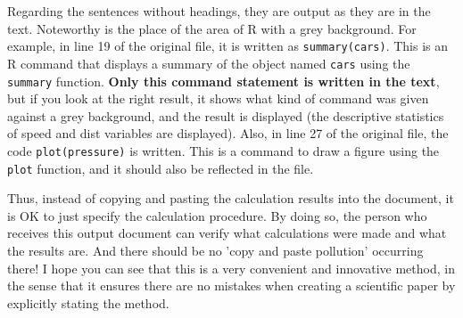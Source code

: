 \documentclass{ltjsbook}
\begin{document}
Regarding the sentences without headings, they are output as they are in the text. Noteworthy is the place of the area of R with a grey background. For example, in line 19 of the original file, it is written as \texttt{summary(cars)}. This is an R command that displays a summary of the object named \texttt{cars} using the \texttt{summary} function. \textbf{Only this command statement is written in the text}, but if you look at the right result, it shows what kind of command was given against a grey background, and the result is displayed (the descriptive statistics of speed and dist variables are displayed). Also, in line 27 of the original file, the code \texttt{plot(pressure)} is written. This is a command to draw a figure using the \texttt{plot} function, and it should also be reflected in the file.


Thus, instead of copying and pasting the calculation results into the document, it is OK to just specify the calculation procedure. By doing so, the person who receives this output document can verify what calculations were made and what the results are. And there should be no 'copy and paste pollution' occurring there! I hope you can see that this is a very convenient and innovative method, in the sense that it ensures there are no mistakes when creating a scientific paper by explicitly stating the method.
\end{document}
